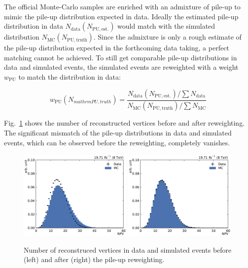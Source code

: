 The official Monte-Carlo samples are enriched with an admixture of pile-up to
mimic the pile-up distribution expected in data. Ideally the estimated pile-up
distribution in data $N_\mathrm{data} (N_\mathrm{PU, est.})$ would match with
the simulated distribution $N_\mathrm{MC} (N_\mathrm{PU, truth})$. Since the
admixture is only a rough estimate of the pile-up distribution expected in the
forthcoming data taking, a perfect matching cannot be achieved. To still get
comparable pile-up distributions in data and simulated events, the simulated
events are reweighted with a weight $w_\mathrm{PU}$ to match the distribution in
data: 

\begin{equation*}
    w_{\mathrm{PU}} (N_{mathrm{PU, truth}}) = \frac{N_\mathrm{data}
    (N_\mathrm{PU, est.}) / \sum N_\mathrm{data}}{N_\mathrm{MC}
    (N_\mathrm{PU, truth}) / \sum N_\mathrm{MC}}
\end{equation*}


Fig.~\ref{fig:mc:npv_reweighting} shows the number of reconstructed vertices
before and after reweighting. The significant mismatch of the
pile-up distributions in data and simulated events, which can be observed before
the reweighting, completely vanishes.

\begin{figure}[htbp]
    \centering
    \includegraphics[width=0.49\textwidth]{figures/measurement/npv_beforereweighting.pdf}\hfill
    \includegraphics[width=0.49\textwidth]{figures/measurement/npv_afterreweighting.pdf}
    \caption[Number of reconstructed vertices]{Number of reconstruced vertices in data and simulated events before
    (left) and after (right) the pile-up reweighting.}
    \label{fig:mc:npv_reweighting}
\end{figure}


